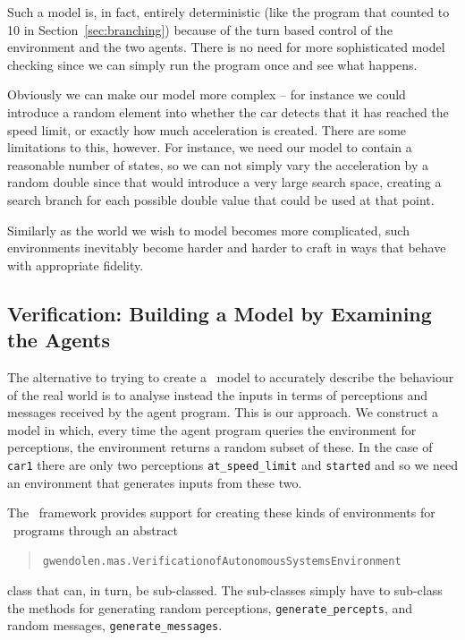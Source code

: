Such a model is, in fact, entirely deterministic (like the program that counted to 10 in Section~\ref{sec:branching}) because of the turn
based control of the environment and the two agents.  There is no need for more sophisticated model checking since we can simply run the program once and see what happens.

Obviously we can make our model more complex -- for instance we could
introduce a random element into whether the car detects that it has
reached the speed limit, or exactly how much acceleration is created.
There are some limitations to this, however.  For instance, we need
our model to contain a reasonable number of states, so we can not
simply vary the acceleration by a random double since that would
introduce a very large search space, creating a search branch for each
possible double value that could be used at that point.

Similarly as the world we wish to model becomes more complicated, such
environments inevitably become harder and harder to craft in ways that
behave with appropriate fidelity.

\subsection{Verification: Building a Model by Examining the Agents}
%
The alternative to trying to create a \java\ model to accurately
describe the behaviour of the real world is to analyse instead
the inputs in terms of perceptions and messages received by the agent
program. This is our approach. We construct a model in which, every
time the agent program queries the environment for perceptions, the
environment returns a random subset of these. In the case
of \lstinline{car1} there are only two perceptions
\lstinline{at_speed_limit} and \lstinline{started} and so we need
an environment that generates inputs from these two.  

The \mcapl\ framework provides support for creating these kinds of environments for \gwendolen\ programs through
an abstract
\begin{quote}
\texttt{gwendolen.mas.VerificationofAutonomousSystemsEnvironment}
\end{quote} class that can, in
turn, be sub-classed.  The sub-classes simply have to sub-class the
methods for generating random perceptions, \lstinline{generate_percepts},
and random messages, \lstinline{generate_messages}.

